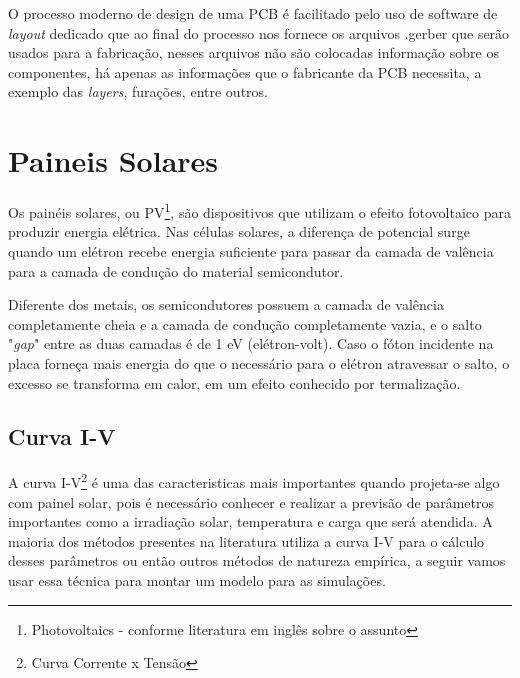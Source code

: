 O processo moderno de design de uma PCB é facilitado pelo uso de software de \textit{layout} dedicado que ao final do processo nos fornece os arquivos .gerber que serão usados para a fabricação, nesses arquivos não são colocadas informação sobre os componentes, há apenas as informações que o fabricante da PCB necessita, a exemplo das \textit{layers}, furações, entre outros.

\section{Paineis Solares}
Os painéis solares, ou PV\footnote{Photovoltaics - conforme literatura em inglês sobre o assunto}, são dispositivos que utilizam o efeito fotovoltaico para produzir energia elétrica. Nas células solares, a diferença de potencial surge quando um elétron recebe energia suficiente para passar da camada de valência para a camada de condução do material semicondutor.

Diferente dos metais, os semicondutores possuem a camada de valência completamente cheia e a camada de condução completamente vazia, e o salto "\textit{gap}" entre as duas camadas é de 1 eV (elétron-volt). Caso o fóton incidente na placa forneça mais energia do que o necessário para o elétron atravessar o salto, o excesso se transforma em calor, em um efeito conhecido por termalização.

\subsection{Curva I-V}
A curva I-V\footnote{Curva Corrente x Tensão} é uma das caracteristicas mais importantes quando projeta-se algo com painel solar, pois é necessário conhecer e realizar a previsão de parâmetros importantes como a irradiação solar, temperatura e carga que será atendida. A maioria dos métodos presentes na literatura utiliza a curva I-V para o cálculo desses parâmetros ou então outros métodos de natureza empírica, a seguir vamos usar essa técnica\cite{pv_datasheet} para montar um modelo para as simulações.

